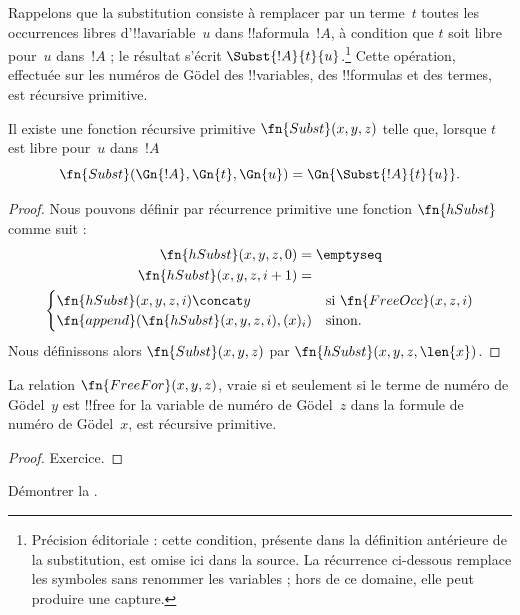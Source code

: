 \documentclass[../../../include/open-logic-section]{subfiles}
\begin{document}

Rappelons que la substitution consiste à remplacer par un terme~$t$
toutes les occurrences libres d'!!a{variable}~$u$ dans
!!a{formula}~$!A$, à condition que $t$ soit libre pour~$u$ dans~$!A$ ; le résultat s'écrit $\Subst{!A}{t}{u}$.\footnote{Précision éditoriale : cette condition, présente dans la définition antérieure de la substitution, est omise ici dans la source. La récurrence ci-dessous remplace les symboles sans renommer les variables ; hors de ce domaine, elle peut produire une capture.} Cette
opération, effectuée sur les numéros de G\"odel des !!{variable}s,
des !!{formula}s et des termes, est récursive primitive.

\begin{prop}
Il existe une fonction récursive primitive $\fn{Subst}(x, y, z)$
telle que, lorsque $t$ est libre pour~$u$ dans~$!A$
\[
\fn{Subst}(\Gn{!A}, \Gn{t}, \Gn{u}) = \Gn{\Subst{!A}{t}{u}}.
\]
\end{prop}

\begin{proof}
Nous pouvons définir par récurrence primitive une fonction
$\fn{hSubst}$ comme suit :
\begin{multline*}
\begin{aligned}
\fn{hSubst}(x, y, z, 0) & = \emptyseq \\
\fn{hSubst}(x, y, z, i+1) & =
\end{aligned}\\
\begin{cases}
\fn{hSubst}(x, y, z, i) \concat y & \text{si $\fn{FreeOcc}(x, z, i)$} \\
\fn{append}(\fn{hSubst}(x, y, z, i), (x)_{i}) & \text{sinon.}
\end{cases}
\end{multline*}
Nous définissons alors $\fn{Subst}(x, y, z)$ par
$\fn{hSubst}(x, y, z, \len{x})$.
\end{proof}

\begin{prop}
La relation $\fn{FreeFor}(x, y, z)$, vraie si et seulement si le terme
de numéro de G\"odel~$y$ est !!{free for} la variable de numéro de
G\"odel~$z$ dans la formule de numéro de G\"odel~$x$, est récursive
primitive.
\end{prop}

\begin{proof} Exercice. \end{proof}

\begin{prob}
Démontrer la .
\end{prob}
\end{document}
